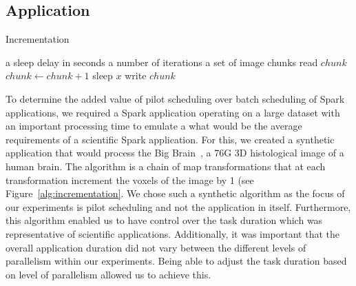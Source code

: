 \documentclass{IEEEtran}
\newcommand{\Desc}[2]{\State \makebox[2em][l]{#1}#2}
\begin{document}
    \subsection{Application}
        \begin{algorithm}\caption{Incrementation}\label{alg:incrementation}              
            \begin{algorithmic}[1]                                                       
                \Input                                                                       
                    \Desc{$x$}{a sleep delay in seconds}                                         
                    \Desc{$n$}{a number of iterations}                                           
                    \Desc{$C$}{a set of image chunks}                                            
                \EndInput                                                                    
                    \State read $chunk$                                        
                        \State $chunk\gets chunk+1$                                              
                        \State sleep $x$                                                         
                    \EndFor                                                                      
                    \State write $chunk$                                            
                \EndFor                                                                      
            \end{algorithmic}                                                                
        \end{algorithm}
    To determine the added value of pilot scheduling over batch scheduling of Spark
    applications, we required a Spark application operating on a large dataset with
    an important processing time to emulate a what would be the average requirements
    of a scientific Spark application. For this, we created a synthetic application 
    that would process the Big Brain~\cite{bigBrain}, a 76G 3D histological
    image of a human brain. The algorithm is a chain of map transformations that
    at each transformation increment the voxels of the image by 1 (see Figure~\ref{alg:incrementation}.
    We chose such a synthetic algorithm
    as the focus of our experiments is pilot scheduling and not the application in
    itself. Furthermore, this algorithm enabled us to have control over the task duration
    which was representative of scientific applications. Additionally, it was important
    that the overall application duration did not vary between the different levels of
    parallelism within our experiments. Being able to adjust the task duration based on
    level of parallelism allowed us to achieve this.
\end{document}
